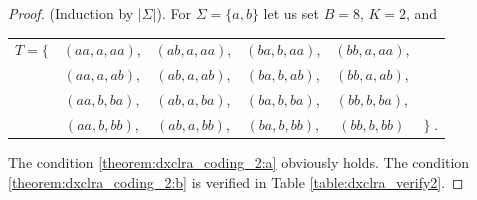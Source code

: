 \begin{proof}
(Induction by $|\Sigma|$). For $\Sigma = \{a, b\}$ let us set $B = 8$, $K = 2$, and
\begin{center}
\begin{tabular}{c c c c c c}
$T = \{$ &
   $(aa, a, aa)$,& $(ab, a, aa)$,& $(ba, b, aa)$,& $(bb, a, aa)$,& \\
 & $(aa, a, ab)$,& $(ab, a, ab)$,& $(ba, b, ab)$,& $(bb, a, ab)$,& \\
 & $(aa, b, ba)$,& $(ab, a, ba)$,& $(ba, b, ba)$,& $(bb, b, ba)$,& \\
 & $(aa, b, bb)$,& $(ab, a, bb)$,& $(ba, b, bb)$,& $(bb, b, bb)$ & $\}\;.$\\
\end{tabular}
\end{center}
The condition \ref{theorem:dxclra_coding_2:a} obviously holds. The condition
\ref{theorem:dxclra_coding_2:b} is verified in Table \ref{table:dxclra_verify2}.


\end{proof}
